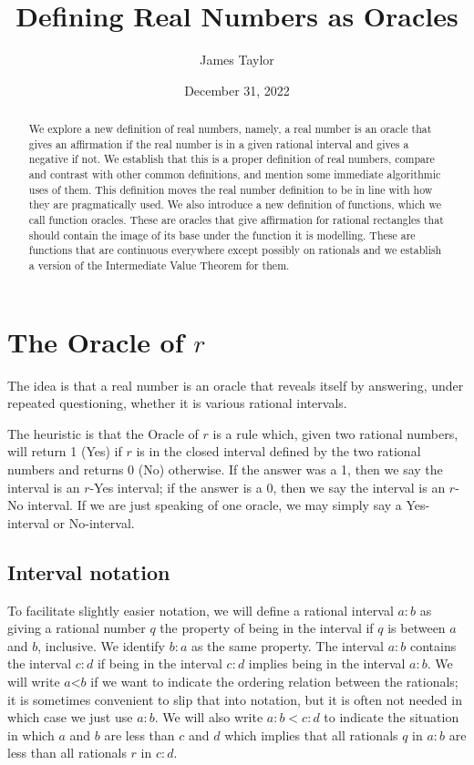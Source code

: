 \documentclass[12pt]{article}
\title{Defining Real Numbers as Oracles}
\author{
  James Taylor
}
\date{December 31, 2022}
\theoremstyle{remark}
\newcommand{\lt}{\mathord{<}}
\begin{document}
\maketitle
\begin{abstract}
We explore a new definition of real numbers, namely, a real number is an oracle that gives an affirmation if the real number is in a given rational interval and gives a negative if not. We establish that this is a proper definition of real numbers, compare and contrast with other common definitions, and mention some immediate algorithmic uses of them. This definition moves the real number definition to be in line with how they are pragmatically used. We also introduce a new definition of functions, which we call function oracles. These are oracles that give affirmation for rational rectangles that should contain the image of its base under the function it is modelling. These are functions that are continuous everywhere except possibly on rationals and we establish a version of the Intermediate Value Theorem for them. 
\end{abstract}

\tableofcontents

\section{The Oracle of $r$}\label{sec:ora}

The idea is that a real number is an oracle that reveals itself by answering, under repeated questioning, whether it is various rational intervals. 

The heuristic is that the Oracle of $r$ is a rule which, given two rational numbers, will return 1 (Yes) if $r$ is in the closed interval defined by the two rational numbers and returns 0 (No) otherwise. If the answer was a 1, then we say the interval is an $r$-Yes interval; if the answer is a 0, then we say the interval is an $r$-No interval.  If we are just speaking of one oracle, we may simply say a Yes-interval or No-interval. 

\subsection{Interval notation}

To facilitate slightly easier notation, we will define a rational interval $a:b$ as giving a rational number $q$ the property of being in the interval if $q$ is between $a$ and $b$, inclusive. We identify $b:a$ as the same property. The interval $a:b$ contains the interval $c:d$ if being in the interval $c:d$ implies being in the interval $a:b$. We will write $a\lt b$ if we want to indicate the ordering relation between the rationals; it is sometimes convenient to slip that into notation, but it is often not needed in which case we just use $a:b$. We will also write $a:b < c:d$ to indicate the situation in which $a$ and $b$ are less than $c$ and $d$ which implies that all rationals $q$ in $a:b$ are less than all rationals $r$ in $c:d$.
\end{document}
